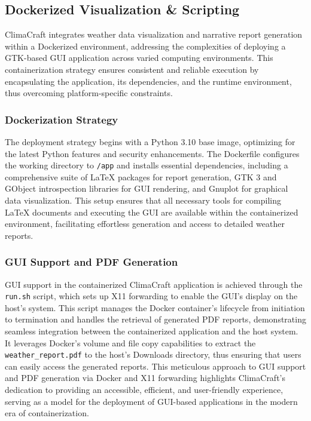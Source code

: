 \documentclass[sn-mathphys-num]{sn-jnl}%
\begin{document}
\subsection{Dockerized Visualization \& Scripting}\label{sec3.5}

ClimaCraft integrates weather data visualization and narrative report generation within a Dockerized environment, addressing the complexities of deploying a GTK-based GUI application across varied computing environments. This containerization strategy ensures consistent and reliable execution by encapsulating the application, its dependencies, and the runtime environment, thus overcoming platform-specific constraints.

\subsubsection{Dockerization Strategy}\label{sec3.5.1}
The deployment strategy begins with a Python 3.10 base image, optimizing for the latest Python features and security enhancements. The Dockerfile configures the working directory to \texttt{/app} and installs essential dependencies, including a comprehensive suite of LaTeX packages for report generation, GTK 3 and GObject introspection libraries for GUI rendering, and Gnuplot for graphical data visualization. This setup ensures that all necessary tools for compiling LaTeX documents and executing the GUI are available within the containerized environment, facilitating effortless generation and access to detailed weather reports.

\subsubsection{GUI Support and PDF Generation}\label{sec3.5.2}
GUI support in the containerized ClimaCraft application is achieved through the \texttt{run.sh} script, which sets up X11 forwarding to enable the GUI's display on the host's system. This script manages the Docker container's lifecycle from initiation to termination and handles the retrieval of generated PDF reports, demonstrating seamless integration between the containerized application and the host system. It leverages Docker's volume and file copy capabilities to extract the \texttt{weather\_report.pdf} to the host's Downloads directory, thus ensuring that users can easily access the generated reports. This meticulous approach to GUI support and PDF generation via Docker and X11 forwarding highlights ClimaCraft's dedication to providing an accessible, efficient, and user-friendly experience, serving as a model for the deployment of GUI-based applications in the modern era of containerization.
\end{document}

